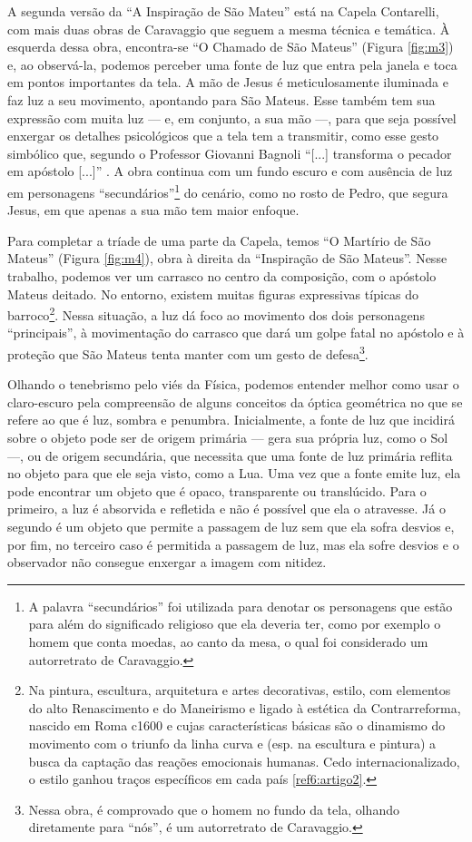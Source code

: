 \begin{multicols}{2}
A segunda versão da ``A Inspiração de São Mateu'' está na Capela Contarelli, com mais duas obras de Caravaggio que seguem a mesma técnica e temática. À esquerda dessa obra, encontra-se ``O Chamado de São Mateus'' (Figura \ref{fig:m3}) e, ao observá-la, podemos perceber uma fonte de luz que entra pela janela e toca em pontos importantes da tela. A mão de Jesus é meticulosamente iluminada e faz luz a seu movimento, apontando para São Mateus. Esse também tem sua expressão com muita luz — e, em conjunto, a sua mão —, para que seja possível enxergar os detalhes psicológicos que a tela tem a transmitir, como esse gesto simbólico que, segundo o Professor Giovanni Bagnoli ``[...] transforma o pecador em apóstolo [...]'' .
A obra continua com um fundo escuro e com ausência de luz em personagens ``secundários''\footnote{A palavra ``secundários'' foi utilizada para denotar os personagens que estão para além do significado religioso que ela deveria ter, como por exemplo o homem que conta moedas, ao canto da mesa, o qual foi considerado um autorretrato de Caravaggio.} do cenário, como no rosto de Pedro, que segura Jesus, em que apenas a sua mão tem maior enfoque. 

Para completar a tríade de uma parte da Capela, temos ``O Martírio de São Mateus'' (Figura \ref{fig:m4}), obra à direita da ``Inspiração de São Mateus''. Nesse trabalho, podemos ver um carrasco no centro da composição, com o apóstolo Mateus deitado. No entorno, existem muitas figuras expressivas típicas do barroco\footnote{Na pintura, escultura, arquitetura e artes decorativas, estilo, com elementos do alto Renascimento e do Maneirismo e ligado à estética da Contrarreforma, nascido em Roma c1600 e cujas características básicas são o dinamismo do movimento com o triunfo da linha curva e (esp. na escultura e pintura) a busca da captação das reações emocionais humanas. Cedo internacionalizado, o estilo ganhou traços específicos em cada país \ref{ref6:artigo2}.}. Nessa situação, a luz dá foco ao movimento dos dois personagens ``principais'', à movimentação do carrasco que dará um golpe fatal no apóstolo e à proteção que São Mateus tenta manter com um gesto de defesa\footnote{Nessa obra, é comprovado que o homem no fundo da tela, olhando diretamente para ``nós'', é um autorretrato de Caravaggio.}.

Olhando o tenebrismo pelo viés da Física, podemos entender melhor como usar o claro-escuro pela compreensão de alguns conceitos da óptica geométrica no que se refere ao que é luz, sombra e penumbra. Inicialmente, a fonte de luz que incidirá sobre o objeto pode ser de origem primária --- gera sua própria luz, como o Sol ---, ou de origem secundária, que necessita que uma fonte de luz primária reflita no objeto para que ele seja visto, como a Lua. Uma vez que a fonte emite luz, ela pode encontrar um objeto que é opaco, transparente ou translúcido. Para o primeiro, a luz é absorvida e refletida e não é possível que ela o atravesse. Já o segundo é um objeto que permite a passagem de luz sem que ela sofra desvios e, por fim, no terceiro caso é permitida a passagem de luz, mas ela sofre desvios e o observador não consegue enxergar a imagem com nitidez. 


\end{multicols}
